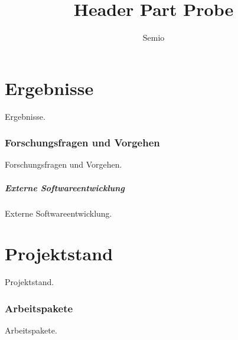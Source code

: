 \documentclass[type=zwischenbericht]{zukunftbau}
\title{Header Part Probe}
\author{Semio}
\begin{document}
\part{Ergebnisse}
Ergebnisse.
\newpage
\section{Forschungsfragen und Vorgehen}
Forschungsfragen und Vorgehen.
\newpage
\subsubsection{Externe Softwareentwicklung}
Externe Softwareentwicklung.
\newpage
\part{Projektstand}
Projektstand.
\newpage
\section{Arbeitspakete}
Arbeitspakete.
\end{document}
